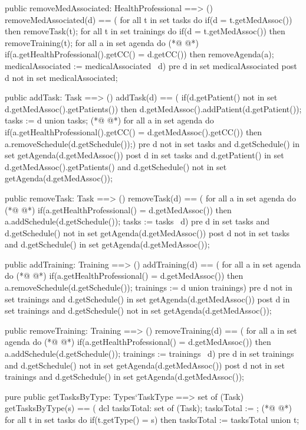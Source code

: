 \begin{vdmpp}[breaklines=true]
 public removeMedAssociated: HealthProfessional ==> ()
  removeMedAssociated(d) == (
   for all t in set tasks do
    if(d = t.getMedAssoc())
     then removeTask(t);
   for all t in set trainings do
    if(d = t.getMedAssoc())
     then removeTraining(t);
   for all a in set agenda do
(*@
\label{addTask:69}
@*)
    if(a.getHealthProfessional().getCC() = d.getCC())
     then removeAgenda(a);
   medicalAssociated := medicalAssociated \ {d})
 pre d in set medicalAssociated
 post d not in set medicalAssociated;
 
 public addTask: Task ==> ()
  addTask(d) == (
   if(d.getPatient() not in set d.getMedAssoc().getPatients())
    then d.getMedAssoc().addPatient(d.getPatient());
   tasks := {d} union tasks;
(*@
\label{removeTask:80}
@*)
   for all a in set agenda do
    if(a.getHealthProfessional().getCC() = d.getMedAssoc().getCC())
      then a.removeSchedule(d.getSchedule());)
 pre d not in set tasks and d.getSchedule() in set getAgenda(d.getMedAssoc())
 post d in set tasks and d.getPatient() in set d.getMedAssoc().getPatients() and d.getSchedule() not in set getAgenda(d.getMedAssoc());
  
 public removeTask: Task ==> ()
  removeTask(d) == (
   for all a in set agenda do
(*@
\label{addTraining:89}
@*)
    if(a.getHealthProfessional() = d.getMedAssoc())
      then a.addSchedule(d.getSchedule());
   tasks := tasks \ {d})
 pre d in set tasks and d.getSchedule() not in set getAgenda(d.getMedAssoc())
 post d not in set tasks and d.getSchedule() in set getAgenda(d.getMedAssoc());
 
 public addTraining: Training ==> ()
  addTraining(d) == (
   for all a in set agenda do
(*@
\label{removeTraining:98}
@*)
    if(a.getHealthProfessional() = d.getMedAssoc())
      then a.removeSchedule(d.getSchedule());
   trainings := {d} union trainings)
 pre d not in set trainings and d.getSchedule() in set getAgenda(d.getMedAssoc())
 post d in set trainings and d.getSchedule() not in set getAgenda(d.getMedAssoc());
  
 public removeTraining: Training ==> ()
  removeTraining(d) == (
   for all a in set agenda do
(*@
\label{getTasksByType:107}
@*)
    if(a.getHealthProfessional() = d.getMedAssoc())
      then a.addSchedule(d.getSchedule());
   trainings := trainings \ {d})
 pre d in set trainings and d.getSchedule() not in set getAgenda(d.getMedAssoc())
 post d not in set trainings and d.getSchedule() in set getAgenda(d.getMedAssoc());
 
 pure public getTasksByType: Types`TaskType ==> set of (Task)
  getTasksByType(s) == (
   dcl tasksTotal: set of (Task);
   tasksTotal := {};
(*@
\label{getTrainingsByType:117}
@*)
   for all t in set tasks do
    if(t.getType() = s)
     then tasksTotal := tasksTotal union {t};
     

\end{vdmpp}
